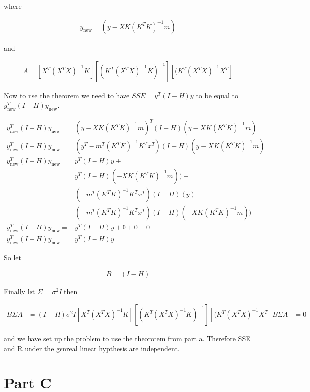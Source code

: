 \documentclass[]{book}
\begin{document}
where

\begin{align}
  y_{\text{new}} = ( y - X K (K^T K)^{-1} m )
\end{align}

and

\begin{align}
  A = [ X^T (X^T X)^{-1} K ] [ (K^T (X^T X)^{-1} K)^{-1} ] [ (K^T (X^T X)^{-1} X^T]
\end{align}

Now to use the therorem we need to have \(SSE = y^T (I-H) y\) to be equal to \(y_{\text{new}}^T (I-H) y_{\text{new}}\).

\begin{align}
  y_{\text{new}}^T (I-H) y_{\text{new}} =& ( y - X K (K^T K)^{-1} m )^T (I-H) ( y - X K (K^T K)^{-1} m ) \\
  y_{\text{new}}^T (I-H) y_{\text{new}} =& ( y^T - m^T(K^T K)^{-1} K^T x^T ) (I-H) ( y - X K (K^T K)^{-1} m ) \\
  y_{\text{new}}^T (I-H) y_{\text{new}} =& y^T (I-H) y + \\
  & y^T (I-H) (- X K (K^T K)^{-1} m )) + \\
  & (-m^T(K^T K)^{-1} K^T x^T ) (I-H) ( y ) + \\
  & (-m^T(K^T K)^{-1} K^T x^T ) (I-H)(- X K (K^T K)^{-1} m ))\\
  y_{\text{new}}^T (I-H) y_{\text{new}} =& y^T (I-H) y + 0 + 0 + 0\\
   y_{\text{new}}^T (I-H) y_{\text{new}} =& y^T (I-H) y
\end{align}

So let

\begin{align}
  B = (I - H)
\end{align}

Finally let \(\Sigma = \sigma^2 I\) then

\begin{align}
  B \Sigma A &= (I - H) \sigma^2 I [ X^T (X^T X)^{-1} K ] [ (K^T (X^T X)^{-1} K)^{-1} ] [ (K^T (X^T X)^{-1} X^T]
  B \Sigma A &= 0
\end{align}

and we have set up the problem to use the theororem from part a. Therefore SSE and R under the genreal linear hypthesis are independent.

\hypertarget{part-c}{%
\section{Part C}\label{part-c}}
\end{document}
